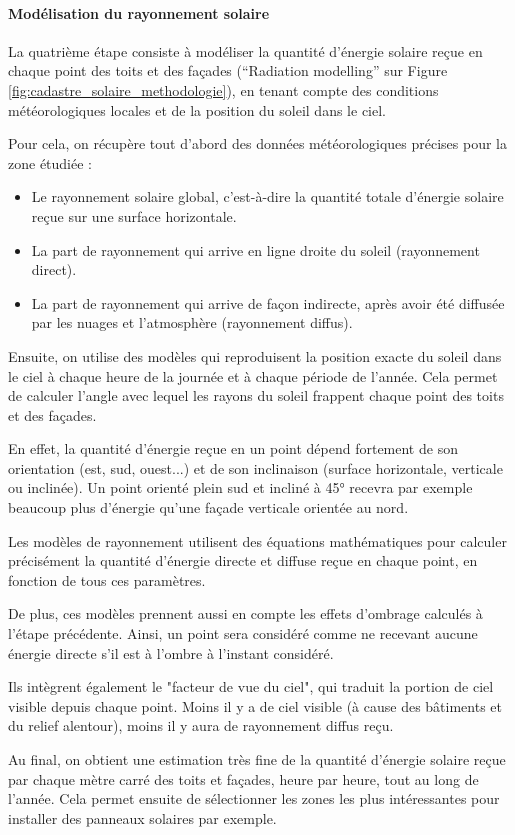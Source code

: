{\paragraph{Modélisation du rayonnement solaire}
\par{La quatrième étape consiste à modéliser la quantité d'énergie solaire reçue en chaque point des toits et des façades (``Radiation modelling'' sur Figure \ref{fig:cadastre_solaire_methodologie}), en tenant compte des conditions météorologiques locales et de la position du soleil dans le ciel.}
\par{Pour cela, on récupère tout d'abord des données météorologiques précises pour la zone étudiée :
\begin{itemize}
    \item Le rayonnement solaire global, c'est-à-dire la quantité totale d'énergie solaire reçue sur une surface horizontale.
    \item La part de rayonnement qui arrive en ligne droite du soleil (rayonnement direct).
    \item La part de rayonnement qui arrive de façon indirecte, après avoir été diffusée par les nuages et l'atmosphère (rayonnement diffus).
\end{itemize}}
\par{Ensuite, on utilise des modèles qui reproduisent la position exacte du soleil dans le ciel à chaque heure de la journée et à chaque période de l'année. Cela permet de calculer l'angle avec lequel les rayons du soleil frappent chaque point des toits et des façades.}
\par{En effet, la quantité d'énergie reçue en un point dépend fortement de son orientation (est, sud, ouest...) et de son inclinaison (surface horizontale, verticale ou inclinée). Un point orienté plein sud et incliné à 45° recevra par exemple beaucoup plus d'énergie qu'une façade verticale orientée au nord.}
\par{Les modèles de rayonnement utilisent des équations mathématiques pour calculer précisément la quantité d'énergie directe et diffuse reçue en chaque point, en fonction de tous ces paramètres.}
\par{De plus, ces modèles prennent aussi en compte les effets d'ombrage calculés à l'étape précédente. Ainsi, un point sera considéré comme ne recevant aucune énergie directe s'il est à l'ombre à l'instant considéré.}
\par{Ils intègrent également le "facteur de vue du ciel", qui traduit la portion de ciel visible depuis chaque point. Moins il y a de ciel visible (à cause des bâtiments et du relief alentour), moins il y aura de rayonnement diffus reçu.}
\par{Au final, on obtient une estimation très fine de la quantité d'énergie solaire reçue par chaque mètre carré des toits et façades, heure par heure, tout au long de l'année. Cela permet ensuite de sélectionner les zones les plus intéressantes pour installer des panneaux solaires par exemple.}

}
